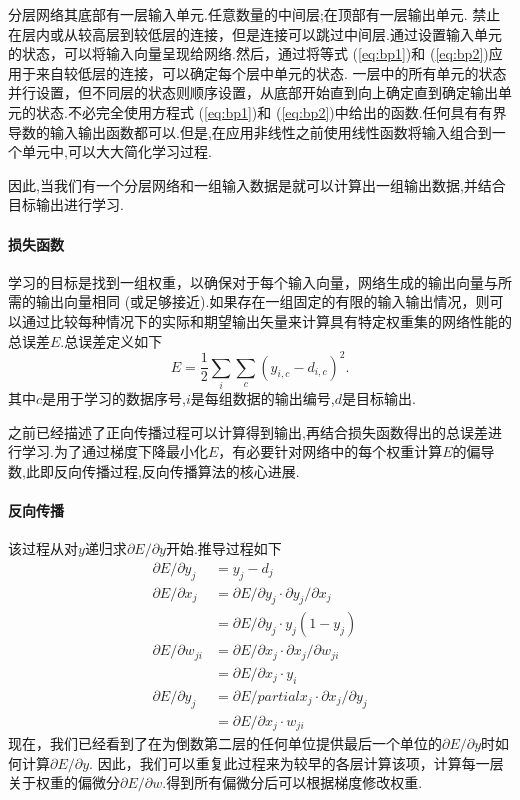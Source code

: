 分层网络其底部有一层输入单元.任意数量的中间层;在顶部有一层输出单元. 禁止在层内或从较高层到较低层的连接，但是连接可以跳过中间层.通过设置输入单元的状态，可以将输入向量呈现给网络.然后，通过将等式 (\ref{eq:bp1})和 (\ref{eq:bp2})应用于来自较低层的连接，可以确定每个层中单元的状态. 一层中的所有单元的状态并行设置，但不同层的状态则顺序设置，从底部开始直到向上确定直到确定输出单元的状态.不必完全使用方程式 (\ref{eq:bp1})和 (\ref{eq:bp2})中给出的函数.任何具有有界导数的输入输出函数都可以.但是,在应用非线性之前使用线性函数将输入组合到一个单元中,可以大大简化学习过程.

因此,当我们有一个分层网络和一组输入数据是就可以计算出一组输出数据,并结合目标输出进行学习.

\paragraph{损失函数}

学习的目标是找到一组权重，以确保对于每个输入向量，网络生成的输出向量与所需的输出向量相同 (或足够接近).如果存在一组固定的有限的输入输出情况，则可以通过比较每种情况下的实际和期望输出矢量来计算具有特定权重集的网络性能的总误差$E$.总误差定义如下
\begin{equation}
  \label{eq:bp3}
  E = \frac{1}{2} \sum_i \sum_c {(y_{i,c} - d_{i,c})}^2.
\end{equation}
其中$c$是用于学习的数据序号,$i$是每组数据的输出编号,$d$是目标输出.

之前已经描述了正向传播过程可以计算得到输出,再结合损失函数得出的总误差进行学习.为了通过梯度下降最小化$E$，有必要针对网络中的每个权重计算$E$的偏导数,此即反向传播过程,反向传播算法的核心进展.

\paragraph{反向传播}

该过程从对$y$递归求$\partial E / \partial y$开始.推导过程如下
\begin{align*}
  \partial E / \partial y_j &= y_j - d_j \\
  \partial E / \partial x_j &= \partial E / \partial y_j \cdot \partial y_j / \partial x_j \\
                            &= \partial E / \partial y_j \cdot y_j(1 - y_j) \\
 \partial E/ \partial w_{ji} &= \partial E/ \partial x_j \cdot \partial x_j / \partial w_{ji} \\
                            &= \partial E / \partial x_j \cdot y_i\\
  \partial E/ \partial y_j &= \partial E / partial x_j \cdot \partial x_j / \partial y_j \\
                            &= \partial E/ \partial x_j \cdot w_{ji}
\end{align*}
现在，我们已经看到了在为倒数第二层的任何单位提供最后一个单位的$\partial E/ \partial y$时如何计算$\partial E/ \partial y$. 因此，我们可以重复此过程来为较早的各层计算该项，计算每一层关于权重的偏微分$\partial E/ \partial w$.得到所有偏微分后可以根据梯度修改权重.


